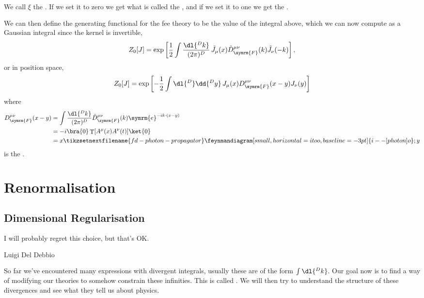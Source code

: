 \documentclass[fleqn]{NotesClass}
\newcommand{\e}{\symrm{e}}
\DeclareMathOperator{\timeOrdering}{T}
\newcommand{\feynman}{\symrm{F}}
\begin{document}
    We call \(\xi\) the .
    If we set it to zero we get what is called the , and if we set it to one we get the .
    
    We can then define the generating functional for the fee theory to be the value of the integral above, which we can now compute as a Gaussian integral since the kernel is invertible,
    \begin{equation}
        Z_0[J] = \exp\left[ \frac{1}{2} \int \frac{\dl{^{D}k}}{(2\pi)^D} \, \tilde{J}_\mu(x) \tilde{D}_{\feynman}^{\mu\nu}(k) \tilde{J}_\nu(-k) \right],
    \end{equation}
    or in position space,
    \begin{equation}
        Z_0[J] = \exp\left[ -\frac{1}{2} \int \dl{^D} \dd{^Dy} \, J_\mu(x) D_{\feynman}^{\mu\nu}(x - y) J_\nu(y)  \right]
    \end{equation}
    where
    \begin{align}
        D^{\mu\nu}_{\feynman}(x - y) &= \int \frac{\dl{^Dk}}{(2\pi)^D} \tilde{D}_{\feynman}^{\mu\nu}(k) \e^{-ik\cdot (x - y)}\\
        &= -i \bra{0} \timeOrdering [A^\mu(x)A^\nu(t)] \ket{0}\\
        &= x
        \tikzsetnextfilename{fd-photon-propagator}
        \feynmandiagram[small, horizontal=i to o, baseline=-3pt]{i -- [photon] o};
        y
    \end{align}
    is the .
    
    \part{Renormalisation}
    \chapter{Dimensional Regularisation}
    \epigraph{I will probably regret this choice, but that's OK.}{Luigi Del Debbio}
    So far we've encountered many expressions with divergent integrals, usually these are of the form \(\int\dl{^Dk}\).
    Our goal now is to find a way of modifying our theories to somehow constrain these infinities.
    This is called .
    We will then try to understand the structure of these divergences and see what they tell us about physics.
    
\end{document}
